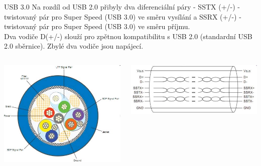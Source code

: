\documentclass[aspectratio=43]{beamer}
\begin{document}
\begin{frame}{USB 3.0}
	Na rozdíl od USB 2.0 přibyly dva diferenciální páry - SSTX (+/-) -
	twistovaný pár pro Super Speed (USB 3.0) ve směru vysílání a SSRX 
	(+/-) - twistovaný pár pro Super Speed (USB 3.0) ve směru příjmu.\\
	Dva vodiče D(+/-) slouží pro zpětnou kompatibilitu s USB 2.0 
	(standardní USB 2.0 sběrnice). Zbylé dva vodiče jsou napájecí.
	
	\begin{columns}
		\begin{center}
			\includegraphics[width=1\linewidth]{extrahovane_obrazky/img_3_page14_0.jpeg}
		\end{center}
		\begin{center}
			\includegraphics[width=1\linewidth]{extrahovane_obrazky/img_3_page14_1.jpeg}
		\end{center}
	\end{columns}
	
\end{frame}
\end{document}
